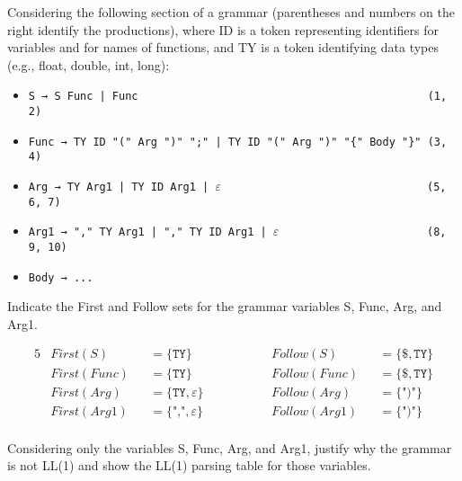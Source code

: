 \documentclass[docid=2021]{comp_exam_round1}
\begin{document}
\setcounter{chapter}{2020}

\examgroup{}

Considering the following section of a grammar (parentheses and numbers on the right identify the productions), where ID is a token representing identifiers for variables and for names of functions, and TY is a token identifying data types (e.g., float, double, int, long):

\begin{itemize}[wide, noitemsep]
    \item \texttt{S → S Func | Func ~~~~~~~~~~~~~~~~~~~~~~~~~~~~~~~~~~~~~~~~~~~~(1, 2)}
    \item \texttt{Func → TY ID "(" Arg ")" ";" | TY ID "(" Arg ")" "\{" Body "\}" (3, 4)}
    \item \texttt{Arg → TY Arg1 | TY ID Arg1 | $\varepsilon$ ~~~~~~~~~~~~~~~~~~~~~~~~~~~~~~~(5, 6, 7)}
    \item \texttt{Arg1 → "," TY Arg1 | "," TY ID Arg1 | $\varepsilon$ ~~~~~~~~~~~~~~~~~~~~~~(8, 9, 10)}
    \item \texttt{Body → ...}
\end{itemize}

\question
Indicate the First and Follow sets for the grammar variables S, Func, Arg, and Arg1.

\ansseparator

\vspace{-2.0em}
\begin{alignat*}{5}
    & First(S   ) &&= \{ \texttt{TY}               \} && ~~~~~~~~~~ && Follow(S   ) &&= \{ \$, \texttt{TY} \} \\
    & First(Func) &&= \{ \texttt{TY}               \} && ~~~~~~~~~~ && Follow(Func) &&= \{ \$, \texttt{TY} \} \\
    & First(Arg ) &&= \{ \texttt{TY}, \varepsilon  \} && ~~~~~~~~~~ && Follow(Arg ) &&= \{ \texttt{")"}    \} \\
    & First(Arg1) &&= \{ \texttt{","}, \varepsilon \} && ~~~~~~~~~~ && Follow(Arg1) &&= \{ \texttt{")"}    \} \\
\end{alignat*}
\vspace{-3.0em}

\question
Considering only the variables S, Func, Arg, and Arg1, justify why the grammar is not LL(1) and show the LL(1) parsing table for those variables.

\ansseparator
\end{document}
